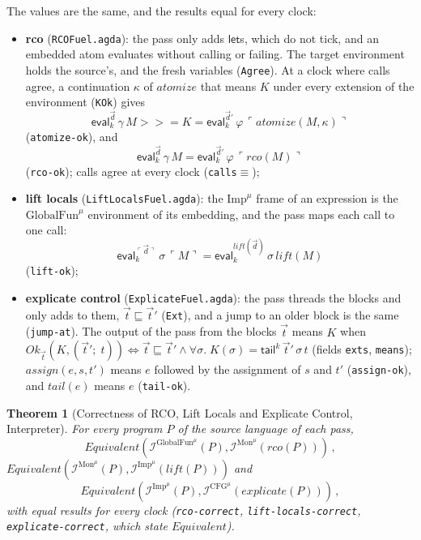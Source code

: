 \documentclass[10pt]{article}
\theoremstyle{acmplain}
\newtheorem{theorem}{Theorem}[section]
\newcommand{\key}[1]{\mathsf{#1}}
\newcommand{\pass}[1]{\mathit{#1}}
\newcommand{\Equiv}{\mathit{Equivalent}}
\newcommand{\bind}{\mathbin{>\!\!>\!\!=}}
\newcommand{\EV}[2]{\key{eval}^{#1}_{#2}}
\newcommand{\Interp}[1]{\mathcal{I}^{#1}}
\newcommand{\Tembed}[1]{\ulcorner #1 \urcorner}  %
\newcommand{\Ml}[1]{\textrm{#1}^{\mu}}                  %
\begin{document}
The values are the same, and the results equal for every clock:
\begin{itemize}
\item \textbf{rco} (\texttt{RCOFuel.agda}): the pass only adds $\key{let}$s,
  which do not tick, and an embedded atom evaluates without calling or
  failing. The target environment holds the source's, and the fresh
  variables (\texttt{Agree}). At a clock where calls agree, a
  continuation $\kappa$ of $\pass{atomize}$ that means $K$ under every
  extension of the environment (\texttt{KOk}) gives
  \[ \EV{\vec{d}}{k}\,\gamma\,M \bind K = \EV{\vec{d}'}{k}\,\varphi\,\Tembed{\pass{atomize}(M, \kappa)} \]
  (\texttt{atomize-ok}), and
  \[ \EV{\vec{d}}{k}\,\gamma\,M = \EV{\vec{d}'}{k}\,\varphi\,\Tembed{\pass{rco}(M)} \]
  (\texttt{rco-ok}); calls agree at every clock (\texttt{calls$\equiv$});
\item \textbf{lift locals} (\texttt{LiftLocalsFuel.agda}): the $\Ml{Imp}$
  frame of an expression is the $\Ml{GlobalFun}$ environment of its embedding,
  and the pass maps each call to one call:
  \[ \EV{\Tembed{\vec{d}}}{k}\,\sigma\,\Tembed{M} = \EV{\pass{lift}(\vec{d})}{k}\,\sigma\,\pass{lift}(M) \]
  (\texttt{lift-ok});
\item \textbf{explicate control} (\texttt{ExplicateFuel.agda}): the pass
  threads the blocks and only adds to them, $\vec{t} \sqsubseteq \vec{t}'$
  (\texttt{Ext}), and a jump to an older block is the same
  (\texttt{jump-at}). The output of the pass from the blocks $\vec{t}$
  means $K$ when $\mathit{Ok}_{\vec{t}}(K, (\vec{t}';\; t)) \iff \vec{t}
  \sqsubseteq \vec{t}' \land \forall \sigma.\; K(\sigma) =
  \key{tail}^k\,\vec{t}'\,\sigma\,t$ (fields \texttt{exts},
  \texttt{means}); $\pass{assign}(e, s, t')$ means $e$ followed by the
  assignment of $s$ and $t'$ (\texttt{assign-ok}), and $\pass{tail}(e)$
  means $e$ (\texttt{tail-ok}).
\end{itemize}
\begin{theorem}[Correctness of RCO, Lift Locals and Explicate Control, Interpreter]\label{thm:m-interp-back}
For every program $P$ of the source language of each pass,
\[ \Equiv(\Interp{\Ml{GlobalFun}}(P), \Interp{\Ml{Mon}}(\pass{rco}(P)))\,, \]
$\Equiv(\Interp{\Ml{Mon}}(P), \Interp{\Ml{Imp}}(\pass{lift}(P)))$ and
\[ \Equiv(\Interp{\Ml{Imp}}(P), \Interp{\Ml{CFG}}(\pass{explicate}(P)))\,, \]
with equal results for every clock (\texttt{rco-correct},
\texttt{lift-locals-correct}, \texttt{explicate-correct}, which state
$\Equiv$).
\end{theorem}
\end{document}
